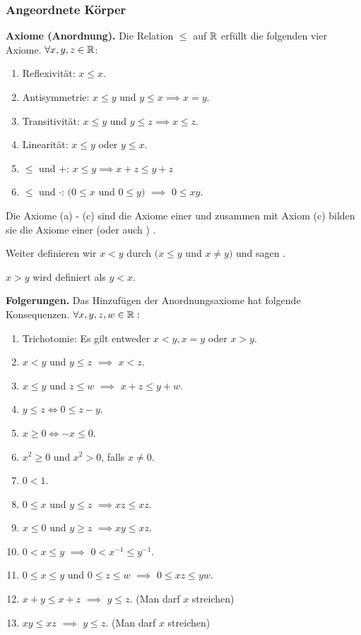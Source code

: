 \subsubsection{Angeordnete Körper}
\textbf{Axiome (Anordnung).} Die Relation $\leq$ auf $\mathbb{R}$ erfüllt die folgenden vier Axiome. $\forall x,y,z \in \mathbb{R}$:
\begin{enumerate}
  \item Reflexivität: $x \leq x$.
  \item Antisymmetrie: $x \leq y$ und $y \leq x \implies x = y$.
  \item Transitivität: $x \leq y$ und $y \leq z \implies x \leq z$.
  \item Linearität: $x \leq y$ oder $y \leq x$.
  \item $\leq$ und $+$: $x \leq y \implies x+z \leq y+z$
  \item $\leq$ und $\cdot$: $(0 \leq x$ und $0 \leq y)$ $\implies$ $0\leq xy$.
\end{enumerate}

Die Axiome (a) - (c) sind die Axiome einer  und zusammen mit Axiom (c) bilden sie die Axiome einer  (oder auch ) .

\begin{mydef-non}
  Weiter definieren wir $x < y$ durch $(x \leq y$ und $x \neq y)$ und sagen .
\end{mydef-non}

\begin{mydef-non}
  $x > y$ wird definiert als $y < x$.
\end{mydef-non}

\textbf{Folgerungen.} Das Hinzufügen der Anordnungsaxiome hat folgende Konsequenzen. $\forall x,y,z,w \in \mathbb{R}:$
\begin{enumerate}
  \item Trichotomie: Es gilt entweder $x < y, x=y$ oder $x > y$.
  \item $x < y$ und $y \leq z$ $\implies$ $x < z$.
  \item $x \leq y$ und $z \leq w$ $\implies$ $x+z \leq y+w$.
  \item $y \leq z \iff 0 \leq z-y$.
  \item $x \geq 0 \iff -x \leq 0$.
  \item $x^2 \geq 0$ und $x^2>0$, falls $x \neq 0$.
  \item $0 < 1$.
  \item $0 \leq x$ und $y \leq z$ $\implies xz \leq xz$.
  \item $x \leq 0$ und $y \geq z$ $\implies xy \leq xz$.
  \item $0 < x \leq y$ $\implies$ $0 < x^{-1} \leq y^{-1}$.
  \item $0 \leq x \leq y$ und $0 \leq z \leq w$ $\implies$ $0 \leq xz \leq yw$.
  \item $x + y \leq x + z$ $\implies$ $y \leq z$. (Man darf $x$ streichen)
  \item $xy \leq xz$ $\implies$ $y \leq z$. (Man darf $x$ streichen)
\end{enumerate}

